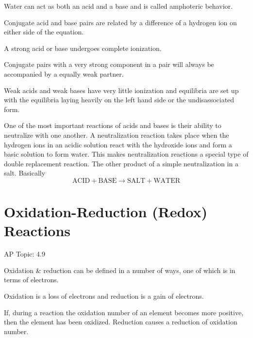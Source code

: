 \documentclass[../chem.tex]{subfiles}
\begin{document}
Water can act as both an acid and a base and is called amphoteric behavior.

Conjugate acid and base pairs are related by a difference of a hydrogen ion on either side of the equation. 

A strong acid or base undergoes complete ionization. 

Conjugate pairs with a very strong component in a pair will always be accompanied by a equally weak partner. 

Weak acids and weak bases have very little ionization and equilibria are set up with the equilibria laying heavily on the left hand side or the undisassociated form.

One of the most important reactions of acids and bases is their ability to neutralize with one another. A neutralization reaction takes place 
when the hydrogen ions in an acidic solution react with the hydroxide ions and form a basic solution to form water. This makes neutralization 
reactions a special type of double replacement reaction. The other product of a simple neutralization in a salt. Basically 
\[\text{ACID}+\text{BASE}\rightarrow \text{SALT}+\text{WATER}\]

\section{Oxidation-Reduction (Redox) Reactions}
AP Topic: 4.9

Oxidation \& reduction can be defined in a number of ways, one of which is in terms of electrons.

Oxidation is a loss of electrons and reduction is a gain of electrons.

If, during a reaction the oxidation number of an element becomes more positive, then the element has been oxidized. Reduction causes a reduction of oxidation number.
\end{document}
